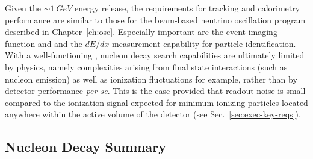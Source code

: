 Given the $\sim \SI{1}{GeV}$ energy release, 
the requirements for tracking 
and calorimetry performance are similar to those for the 
beam-based neutrino oscillation program described 
in Chapter~\ref{ch:osc}.  Especially important are the 
event imaging function and and the $dE/dx$ measurement 
capability for particle identification.   
With a well-functioning \lartpc, nucleon decay search  
capabilities are ultimately limited by physics, namely
complexities arising from 
final state interactions (such as nucleon emission) 
as well as ionization fluctuations for example, 
rather than by detector performance {\sl per se}. This is 
the case provided that readout noise is small compared to 
the ionization signal expected for minimum-ionizing particles
located anywhere within the active volume of the detector 
(see Sec.~\ref{sec:exec-key-reqs}).




\subsection{Nucleon Decay Summary}
\label{sec:ndksummary}

